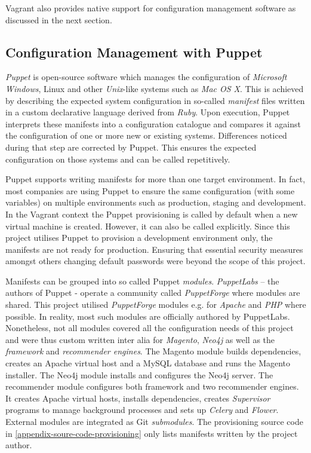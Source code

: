 Vagrant also provides native support for configuration management software as discussed in the next section.

\subsection{Configuration Management with Puppet}

\emph{Puppet} is open-source software which manages the configuration of \emph{Microsoft Windows}, Linux and other \emph{Unix}-like systems such as \emph{Mac OS X}. This is achieved by describing the expected system configuration in so-called \emph{manifest} files written in a custom declarative language derived from \emph{Ruby}. Upon execution, Puppet interprets these manifests into a configuration catalogue and compares it against the configuration of one or more new or existing systems. Differences noticed during that step are corrected by Puppet. This ensures the expected configuration on those systems and can be called repetitively.

Puppet supports writing manifests for more than one target environment. In fact, most companies are using Puppet to ensure the same configuration (with some variables) on multiple environments such as production, staging and development. In the Vagrant context the Puppet provisioning is called by default when a new virtual machine is created. However, it can also be called explicitly. Since this project utilises Puppet to provision a development environment only, the manifests are not ready for production. Ensuring that essential security measures amongst others changing default passwords were beyond the scope of this project.

Manifests can be grouped into so called Puppet \emph{modules}. \emph{PuppetLabs} -- the authors of Puppet - operate a community called \emph{PuppetForge} where modules are shared. This project utilised \emph{PuppetForge} modules e.g. for \emph{Apache} and \emph{PHP} where possible. In reality, most such modules are officially authored by PuppetLabs. Nonetheless, not all modules covered all the configuration needs of this project and were thus custom written inter alia for \emph{Magento}, \emph{Neo4j} as well as the \emph{framework} and \emph{recommender engines}. The Magento module builds dependencies, creates an Apache virtual host and a MySQL database and runs the Magento installer. The Neo4j module installs and configures the Neo4j server. The recommender module configures both framework and two recommender engines. It creates Apache virtual hosts, installs dependencies, creates \emph{Supervisor} programs to manage background processes and sets up \emph{Celery} and \emph{Flower}. External modules are integrated as Git \emph{submodules}. The provisioning source code in \ref{appendix-soure-code-provisioning} only lists manifests written by the project author.

